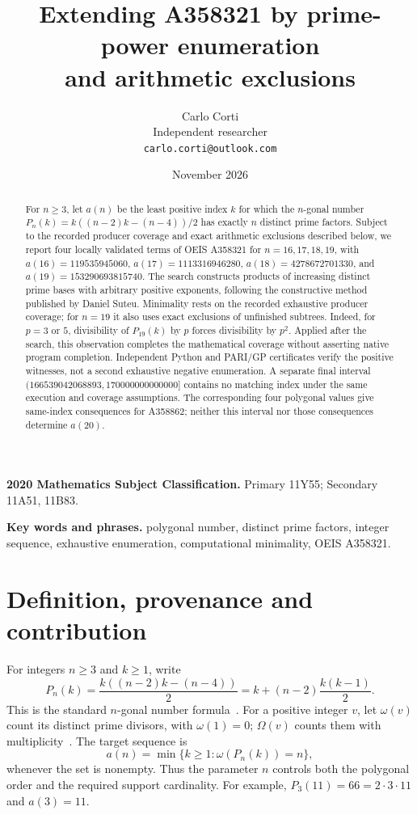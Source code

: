 \documentclass[11pt]{article}
\title{Extending A358321 by prime-power enumeration\protect\\and arithmetic exclusions}
\author{Carlo Corti\\Independent researcher\\\texttt{carlo.corti@outlook.com}}
\date{November 2026}
\theoremstyle{remark}
\begin{document}
\maketitle
\begin{abstract}
For $n\geq3$, let $a(n)$ be the least positive index $k$ for which the
$n$-gonal number $P_n(k)=k((n-2)k-(n-4))/2$ has exactly $n$ distinct prime
factors. Subject to the recorded producer coverage and exact arithmetic exclusions
described below, we report four locally validated terms of OEIS A358321
for $n=16,17,18,19$, with
$a(16)=119535945060$, $a(17)=1113316946280$,
$a(18)=4278672701330$, and $a(19)=153290693815740$.
The search constructs products of increasing distinct prime bases with
arbitrary positive exponents, following the constructive method published
by Daniel Suteu. Minimality rests on the recorded exhaustive producer
coverage; for $n=19$ it also uses exact exclusions of unfinished subtrees.
Indeed, for $p=3$ or $5$, divisibility of $P_{19}(k)$ by $p$ forces
divisibility by $p^2$. Applied after the search, this observation completes
the mathematical coverage without asserting native program completion.
Independent Python and PARI/GP certificates verify the positive witnesses,
not a second exhaustive negative enumeration. A separate final interval
$(166539042068893,170000000000000]$ contains no matching index under
the same execution and coverage assumptions.
The corresponding four polygonal values give same-index consequences for
A358862; neither this interval nor those consequences determine $a(20)$.
\end{abstract}

\noindent\textbf{2020 Mathematics Subject Classification.}
Primary 11Y55; Secondary 11A51, 11B83.

\medskip
\noindent\textbf{Key words and phrases.}
polygonal number, distinct prime factors, integer sequence, exhaustive enumeration,
computational minimality, OEIS A358321.

\section{Definition, provenance and contribution}\label{sec:intro}
For integers $n\geq3$ and $k\geq1$, write
\begin{equation}\label{eq:polygon}
 P_n(k)=\frac{k((n-2)k-(n-4))}{2}
       =k+(n-2)\frac{k(k-1)}2.
\end{equation}
This is the standard $n$-gonal number formula~\cite{polygonal}.
For a positive integer $v$, let $\omega(v)$ count its distinct prime divisors,
with $\omega(1)=0$; $\Omega(v)$ counts them with multiplicity~\cite{distinct}.
The target sequence is
\begin{equation}\label{eq:def}
 a(n)=\min\{k\geq1:\omega(P_n(k))=n\},
\end{equation}
whenever the set is nonempty. Thus the parameter $n$ controls both the
polygonal order and the required support cardinality. For example,
$P_3(11)=66=2\cdot3\cdot11$ and $a(3)=11$.
\end{document}
